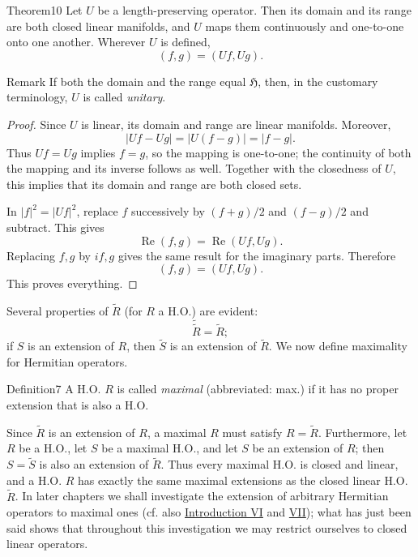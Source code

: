 ﻿\documentclass[paper=b5,fontsize=13pt,bookmarkpackage=false,twoside]{scrartcl}
\begin{document}
\begin{namedstatement}{Theorem}{10}\label{thm:10}
Let $U$ be a length-preserving operator. Then its domain and its range are both closed linear manifolds, and $U$ maps them continuously and one-to-one onto one another. Wherever $U$ is defined,
\[
(f,g)=(Uf,Ug).
\]
\end{namedstatement}

\begin{namedstatement}{Remark}{}\label{rem:10}
If both the domain and the range equal $\mathfrak H$, then, in the customary terminology, $U$ is called \emph{unitary}.
\end{namedstatement}

\begin{proof}
Since $U$ is linear, its domain and range are linear manifolds. Moreover,
\[
|Uf-Ug|=|U(f-g)|=|f-g|.
\]
Thus $Uf=Ug$ implies $f=g$, so the mapping is one-to-one; the continuity of both the mapping and its inverse follows as well. Together with the closedness of $U$, this implies that its domain and range are both closed sets.

In $|f|^2=|Uf|^2$, replace $f$ successively by $(f+g)/2$ and $(f-g)/2$ and subtract. This gives
\[
\operatorname{Re}(f,g)=\operatorname{Re}(Uf,Ug).
\]
Replacing $f,g$ by $if,g$ gives the same result for the imaginary parts. Therefore
\[
(f,g)=(Uf,Ug).
\]
This proves everything.
\end{proof}

Several properties of $\widetilde R$ (for $R$ a H.O.) are evident:
\[
\widetilde{\widetilde R}=\widetilde R;
\]
if $S$ is an extension of $R$, then $\widetilde S$ is an extension of $\widetilde R$. We now define maximality for Hermitian operators.

\begin{namedstatement}{Definition}{7}\label{def:7}
A H.O. $R$ is called \emph{maximal} (abbreviated: max.) if it has no proper extension that is also a H.O.
\end{namedstatement}

Since $\widetilde R$ is an extension of $R$, a maximal $R$ must satisfy $R=\widetilde R$. Furthermore, let $R$ be a H.O., let $S$ be a maximal H.O., and let $S$ be an extension of $R$; then $S=\widetilde S$ is also an extension of $\widetilde R$. Thus every maximal H.O. is closed and linear, and a H.O. $R$ has exactly the same maximal extensions as the closed linear H.O. $\widetilde R$. In later chapters we shall investigate the extension of arbitrary Hermitian operators to maximal ones (cf. also \hyperref[intro:VI]{Introduction VI} and \hyperref[intro:VII]{VII}); what has just been said shows that throughout this investigation we may restrict ourselves to closed linear operators.
\end{document}
